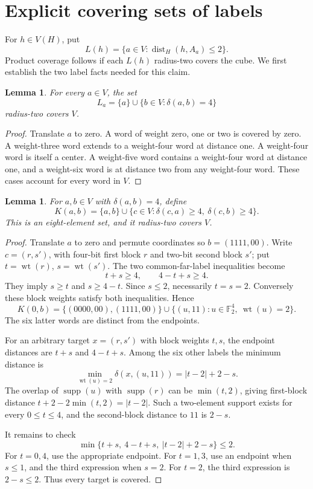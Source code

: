 \documentclass[11pt]{article}
\newtheorem{lemma}[theorem]{Lemma}
\theoremstyle{definition}
\theoremstyle{remark}
\newcommand{\F}{\mathbb F}
\newcommand{\wt}{\operatorname{wt}}
\newcommand{\dist}{\operatorname{dist}}
\newcommand{\supp}{\operatorname{supp}}
\begin{document}
\section{Explicit covering sets of labels}\label{sec:labels}
For \(h\in V(H)\), put
\[
 L(h)=\{a\in V:\dist_H(h,A_a)\le2\}.
\]
Product coverage follows if each \(L(h)\) radius-two covers the cube.
We first establish the two label facts needed for this claim.

\begin{lemma}\label{lem:single-cover}
For every \(a\in V\), the set
\[
 L_a=\{a\}\cup\{b\in V:\delta(a,b)=4\}
\]
radius-two covers \(V\).
\end{lemma}
\begin{proof}
Translate \(a\) to zero. A word of weight zero, one or two is
covered by zero. A weight-three word extends to a weight-four
word at distance one. A weight-four word is itself a center.
A weight-five word contains a weight-four word at distance one,
and a weight-six word is at distance two from any weight-four
word. These cases account for every word in \(V\).
\end{proof}

\begin{lemma}\label{lem:pair-cover}
For \(a,b\in V\) with \(\delta(a,b)=4\), define
\[
 K(a,b)=\{a,b\}\cup
   \{c\in V:\delta(c,a)\ge4,\ \delta(c,b)\ge4\}.
\]
This is an eight-element set, and it radius-two covers \(V\).
\end{lemma}
\begin{proof}
Translate \(a\) to zero and permute coordinates so \(b=(1111,00)\).
Write \(c=(r,s')\), with four-bit first block \(r\) and two-bit
second block \(s'\); put \(t=\wt(r)\), \(s=\wt(s')\).
The two common-far-label inequalities become
\[
 t+s\ge4,\qquad 4-t+s\ge4.
\]
They imply \(s\ge t\) and \(s\ge4-t\).
Since \(s\le2\), necessarily \(t=s=2\).
Conversely these block weights satisfy both inequalities. Hence
\begin{equation}\label{eq:K-normalized}
 K(0,b)=\{(0000,00),(1111,00)\}
       \cup\{(u,11):u\in\F_2^4,\ \wt(u)=2\}.
\end{equation}
The six latter words are distinct from the endpoints.

For an arbitrary target \(x=(r,s')\) with block weights \(t,s\),
the endpoint distances are \(t+s\) and \(4-t+s\).
Among the six other labels the minimum distance is
\begin{equation}\label{eq:pair-minimum}
 \min_{\wt(u)=2}\delta(x,(u,11))=|t-2|+2-s.
\end{equation}
The overlap of \(\supp(u)\) with \(\supp(r)\) can be \(\min(t,2)\),
giving first-block distance
\(t+2-2\min(t,2)=|t-2|\). Such a two-element support exists for
every \(0\le t\le4\), and the second-block distance to \(11\) is \(2-s\).

It remains to check
\begin{equation}\label{eq:three-minimum}
 \min\{t+s,\ 4-t+s,\ |t-2|+2-s\}\le2.
\end{equation}
For \(t=0,4\), use the appropriate endpoint.
For \(t=1,3\), use an endpoint when \(s\le1\), and the third
expression when \(s=2\). For \(t=2\), the third expression is
\(2-s\le2\). Thus every target is covered.
\end{proof}
\end{document}
